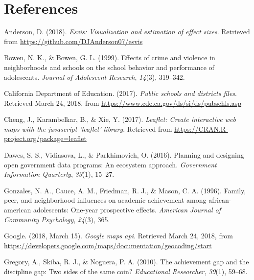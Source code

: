\documentclass[man, fleqn, noextraspace]{apa6}
\theoremstyle{definition}
\theoremstyle{definition}
\theoremstyle{definition}
\theoremstyle{remark}
\begin{document}
\newpage

\hypertarget{references}{%
\section{References}\label{references}}

\begingroup\setlength{\parindent}{-0.5in}\setlength{\leftskip}{0.25in}

\hypertarget{refs}{}
\leavevmode\hypertarget{ref-esvis}{}%
Anderson, D. (2018). \emph{Esvis: Visualization and estimation of effect
sizes}. Retrieved from \url{https://github.com/DJAnderson07/esvis}

\leavevmode\hypertarget{ref-bowen99}{}%
Bowen, N. K., \& Bowen, G. L. (1999). Effects of crime and violence in
neighborhoods and schools on the school behavior and performance of
adolescents. \emph{Journal of Adolescent Research}, \emph{14}(3),
319--342.

\leavevmode\hypertarget{ref-ca17b}{}%
California Department of Education. (2017). \emph{Public schools and
districts files}. Retrieved March 24, 2018, from
\url{https://www.cde.ca.gov/ds/si/ds/pubschls.asp}

\leavevmode\hypertarget{ref-leaflet}{}%
Cheng, J., Karambelkar, B., \& Xie, Y. (2017). \emph{Leaflet: Create
interactive web maps with the javascript 'leaflet' library}. Retrieved
from \url{https://CRAN.R-project.org/package=leaflet}

\leavevmode\hypertarget{ref-dawes16}{}%
Dawes, S. S., Vidiasova, L., \& Parkhimovich, O. (2016). Planning and
designing open government data programs: An ecosystem approach.
\emph{Government Information Quarterly}, \emph{33}(1), 15--27.

\leavevmode\hypertarget{ref-gonzales96}{}%
Gonzales, N. A., Cauce, A. M., Friedman, R. J., \& Mason, C. A. (1996).
Family, peer, and neighborhood influences on academic achievement among
african-american adolescents: One-year prospective effects.
\emph{American Journal of Community Psychology}, \emph{24}(3), 365.

\leavevmode\hypertarget{ref-google}{}%
Google. (2018, March 15). \emph{Google maps api}. Retrieved March 24,
2018, from
\url{https://developers.google.com/maps/documentation/geocoding/start}

\leavevmode\hypertarget{ref-gregory10}{}%
Gregory, A., Skiba, R. J., \& Noguera, P. A. (2010). The achievement gap
and the discipline gap: Two sides of the same coin? \emph{Educational
Researcher}, \emph{39}(1), 59--68.
\end{document}
